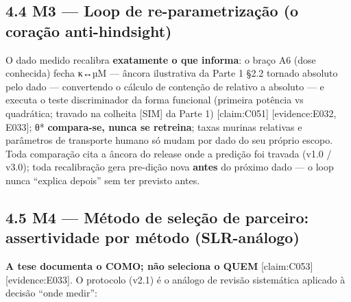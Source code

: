 \documentclass[
  12pt,
]{report}
\begin{document}
\hypertarget{m3-loop-de-re-parametrizauxe7uxe3o-o-corauxe7uxe3o-anti-hindsight}{%
\subsection{4.4 M3 --- Loop de re-parametrização (o coração
anti-hindsight)}\label{m3-loop-de-re-parametrizauxe7uxe3o-o-corauxe7uxe3o-anti-hindsight}}

O dado medido recalibra \textbf{exatamente o que informa}: o braço A6
(dose conhecida) fecha κ↔µM --- âncora ilustrativa da Parte 1 §2.2
tornado absoluto pelo dado --- convertendo o cálculo de contenção de
relativo a absoluto --- e executa o teste discriminador da forma
funcional (primeira potência vs quadrática; travado na colheita
{[}SIM{]} da Parte 1) {[}claim:C051{]} {[}evidence:E032, E033{]}; θ*
\textbf{compara-se, nunca se retreina}; taxas murinas relativas e
parâmetros de transporte humano só mudam por dado do seu próprio escopo.
Toda comparação cita a âncora do release onde a predição foi travada
(v1.0 / v3.0); toda recalibração gera pre-dição nova \textbf{antes} do
próximo dado --- o loop nunca ``explica depois'' sem ter previsto antes.

\hypertarget{m4-muxe9todo-de-seleuxe7uxe3o-de-parceiro-assertividade-por-muxe9todo-slr-anuxe1logo}{%
\subsection{4.5 M4 --- Método de seleção de parceiro: assertividade por
método
(SLR-análogo)}\label{m4-muxe9todo-de-seleuxe7uxe3o-de-parceiro-assertividade-por-muxe9todo-slr-anuxe1logo}}

\textbf{A tese documenta o COMO; não seleciona o QUEM} {[}claim:C053{]}
{[}evidence:E033{]}. O protocolo (v2.1) é o análogo de revisão
sistemática aplicado à decisão ``onde medir'':
\end{document}
